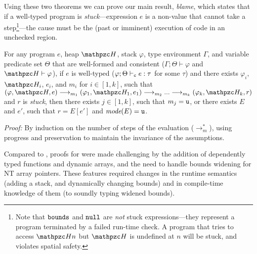 Using these two theorems we can prove our main result, {\em blame},
which states that
  if a well-typed program is \emph{stuck}---expression
$e$ is a non-value that cannot take a step\footnote{Note that
  $\mathtt{bounds}$ and $\mathtt{null}$ are \emph{not} stuck expressions---they represent a
  program terminated by a failed run-time check. A program that tries to access $\heap{n}$
  but $\heap$ is undefined at $n$ will be stuck, and violates spatial
  safety.}---the cause must be the
(past or imminent) execution of code in an unchecked region.


\begin{thm}\label{thm:blame} For any \checkedc
  program $e$, heap $\heap$, stack
$\varphi$, type environment $\Gamma$, and variable predicate set $\Theta$
that are well-formed and consistent
($\Gamma;\Theta\vdash \varphi$ and $\heap \vdash \varphi$),
if $e$ is well-typed ($\varphi;\Theta\vdash_{\texttt{c}} e :
\tau$ for some $\tau$) and there exists
$\varphi_i$, $\heap_i$, $e_i$, and $m_i$ for $i\in [1,k]$, such that
$(\varphi,\heap,e) \longrightarrow_{m_1} (\varphi_1,\heap_1,e_1)\longrightarrow_{m_2} ...\longrightarrow_{m_k} (\varphi_k,\heap_k,r)$ and $r$ is \emph{stuck}, then
there exists $j \in [1,k]$, such that $m_j = \texttt{u}$, or there exists $E$ and $e'$, such that $r = E[e']$ and $\textit{mode}(E) = \texttt{u}$.
\end{thm}
{\em Proof:} By induction on the number of steps of the \checkedc
evaluation ($\longrightarrow_m^*$), using progress and preservation to
maintain the invariance of the assumptions.

  Compared to \citet{ruef18checkedc-incr}, proofs for
  \lang were made challenging by the addition of dependently typed
  functions and dynamic arrays, and the need to handle bounds widening for NT
  array pointers. These features required changes in the runtime
  semantics (adding a stack, and dynamically changing bounds) and in
  compile-time knowledge of them (to soundly typing widened bounds).


